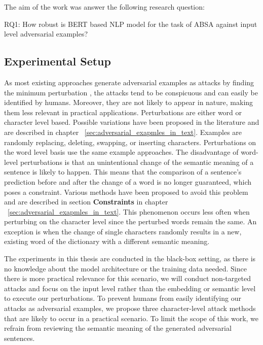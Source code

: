 The aim of the work was answer the following research question:

RQ1: How robust is BERT based NLP model for the task of ABSA against input level adversarial examples?


\subsection{Experimental Setup} 
As most existing approaches generate adversarial examples as attacks by finding the minimum perturbation \cite{liang2017deep, ebrahimi2017hotflip, gao2018black, li2018textbugger, alzantot2018generating, jin2019bert, garg2020bae}, the attacks tend to be conspicuous and can easily be identified by humans. Moreover, they are not likely to appear in nature, making them less relevant in practical applications. Perturbations are either word or character level based. Possible variations have been proposed in the literature and are described in chapter ~\ref{sec:adversarial_exapmles_in_text}. Examples are randomly replacing, deleting, swapping, or inserting characters. Perturbations on the word level basis use the same example approaches.  
The disadvantage of word-level perturbations is that an unintentional change of the semantic meaning of a sentence is likely to happen. This means that the comparison of a sentence's prediction before and after the change of a word is no longer guaranteed, which poses a constraint. Various methods have been proposed to avoid this problem and are described in section \textbf{Constraints} in chapter ~\ref{sec:adversarial_exapmles_in_text}. 
This phenomenon occurs less often when perturbing on the character level since the perturbed words remain the same. An exception is when the change of single characters randomly results in a new, existing word of the dictionary with a different semantic meaning. 

The experiments in this thesis are conducted in the black-box setting, as there is no knowledge about the model architecture or the training data needed. Since there is more practical relevance for this scenario, we will conduct non-targeted attacks and focus on the input level rather than the embedding or semantic level to execute our perturbations. 
To prevent humans from easily identifying our attacks as adversarial examples, we propose three character-level attack methods that are likely to occur in a practical scenario.
To limit the scope of this work, we refrain from reviewing the semantic meaning of the generated adversarial sentences.

